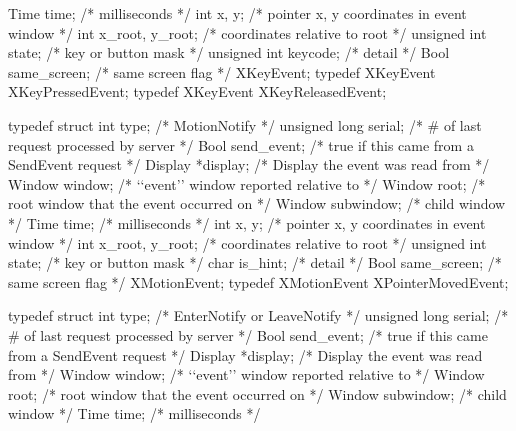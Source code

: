 \documentclass{report}
\begin{document}
\begin{itemize}
\begin{cppcode}
{                    Time time;              /* milliseconds */
                    int x, y;               /* pointer x, y coordinates in event window */
                    int x_root, y_root;     /* coordinates relative to root */
                    unsigned int state;     /* key or button mask */
                    unsigned int keycode;   /* detail */
                    Bool same_screen;       /* same screen flag */
                } XKeyEvent;
                typedef XKeyEvent XKeyPressedEvent;
                typedef XKeyEvent XKeyReleasedEvent;
            \end{cppcode}
            \begin{cppcode}
                typedef struct {
                    int type;               /* MotionNotify */
                    unsigned long serial;   /* # of last request processed by server */
                    Bool send_event;        /* true if this came from a SendEvent request */
                    Display *display;       /* Display the event was read from */
                    Window window;          /* ‘‘event’’ window reported relative to */
                    Window root;            /* root window that the event occurred on */
                    Window subwindow;       /* child window */
                    Time time;              /* milliseconds */
                    int x, y;               /* pointer x, y coordinates in event window */
                    int x_root, y_root;     /* coordinates relative to root */
                    unsigned int state;     /* key or button mask */
                    char is_hint;           /* detail */
                    Bool same_screen;       /* same screen flag */
                } XMotionEvent;
                typedef XMotionEvent XPointerMovedEvent;
            \end{cppcode}
            \begin{cppcode}
                typedef struct {
                    int type;               /* EnterNotify or LeaveNotify */
                    unsigned long serial;   /* # of last request processed by server */
                    Bool send_event;        /* true if this came from a SendEvent request */
                    Display *display;       /* Display the event was read from */
                    Window window;          /* ‘‘event’’ window reported relative to */
                    Window root;            /* root window that the event occurred on */
                    Window subwindow;       /* child window */
                    Time time;              /* milliseconds */
}
\end{cppcode}
\end{itemize}
\end{document}
